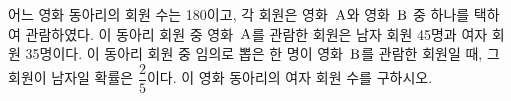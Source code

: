 어느 영화 동아리의 회원 수는 180이고, 각 회원은 영화~$\mathrm{A}$와 영화~$\mathrm{B}$ 중 하나를 택하여 관람하였다. 이 동아리 회원 중 영화~$\mathrm{A}$를 관람한 회원은 남자 회원 45명과 여자 회원 35명이다. 이 동아리 회원 중 임의로 뽑은 한 명이 영화~$\mathrm{B}$를 관람한 회원일 때, 그 회원이 남자일 확률은 $\dfrac{2}{5}$이다. 이 영화 동아리의 여자 회원 수를 구하시오.
